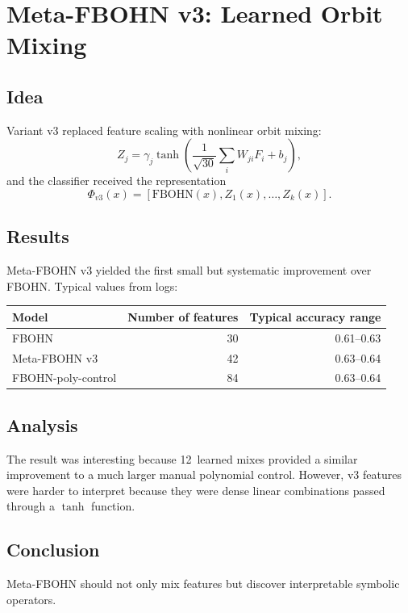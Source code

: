 \section{Meta-FBOHN v3: Learned Orbit Mixing}
\label{sec:meta_fbohn_v3}

\subsection{Idea}
Variant v3 replaced feature scaling with nonlinear orbit mixing:
\[
Z_j=\gamma_j\tanh\!\left(\frac{1}{\sqrt{30}}\sum_i W_{ji}F_i+b_j\right),
\]
and the classifier received the representation
\[
\Phi_{v3}(x)=[\text{FBOHN}(x),Z_1(x),\ldots,Z_k(x)].
\]

\subsection{Results}
Meta-FBOHN v3 yielded the first small but systematic improvement over FBOHN. Typical values from logs:
\begin{center}
\begin{tabular}{lrr}
\toprule
Model & Number of features & Typical accuracy range\\
\midrule
FBOHN & 30 & 0.61--0.63\\
Meta-FBOHN v3 & 42 & 0.63--0.64\\
FBOHN-poly-control & 84 & 0.63--0.64\\
\bottomrule
\end{tabular}
\end{center}

\subsection{Analysis}
The result was interesting because 12~learned mixes provided a similar improvement to a much larger manual polynomial control. However, v3 features were harder to interpret because they were dense linear combinations passed through a $\tanh$ function.

\subsection{Conclusion}
Meta-FBOHN should not only mix features but discover interpretable symbolic operators.
